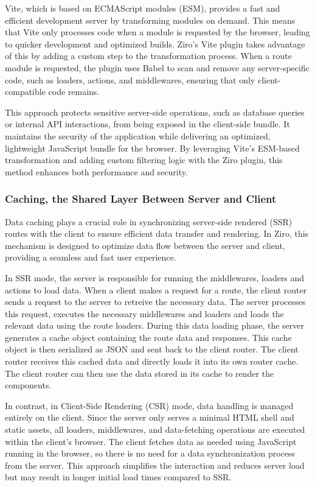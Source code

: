 Vite, which is based on ECMAScript modules (ESM), provides a fast and efficient development server by transforming modules on demand. This means that Vite only processes code when a module is requested by the browser, leading to quicker development and optimized builds. Ziro's Vite plugin takes advantage of this by adding a custom step to the transformation process. When a route module is requested, the plugin uses Babel to scan and remove any server-specific code, such as loaders, actions, and middlewares, ensuring that only client-compatible code remains.

This approach protects sensitive server-side operations, such as database queries or internal API interactions, from being exposed in the client-side bundle. It maintains the security of the application while delivering an optimized, lightweight JavaScript bundle for the browser. By leveraging Vite's ESM-based transformation and adding custom filtering logic with the Ziro plugin, this method enhances both performance and security.


\subsubsection{Caching, the Shared Layer Between Server and Client}

Data caching plays a crucial role in synchronizing server-side rendered (SSR) routes with the client to ensure efficient data transfer and rendering. In Ziro, this mechanism is designed to optimize data flow between the server and client, providing a seamless and fast user experience.

In SSR mode, the server is responsible for running the middlewares, loaders and actions to load data. When a client makes a request for a route, the client router sends a request to the server to retreive the necessary data. The server processes this request, executes the necessary middlewares and loaders and loads the relevant data using the route loaders. During this data loading phase, the server generates a cache object containing the route data and responses. This cache object is then serialized as JSON and sent back to the client router. The client router receives this cached data and directly loads it into its own router cache. The client router can then use the data stored in its cache to render the components.

In contrast, in Client-Side Rendering (CSR) mode, data handling is managed entirely on the client. Since the server only serves a minimal HTML shell and static assets, all loaders, middlewares, and data-fetching operations are executed within the client's browser. The client fetches data as needed using JavaScript running in the browser, so there is no need for a data synchronization process from the server. This approach simplifies the interaction and reduces server load but may result in longer initial load times compared to SSR.

